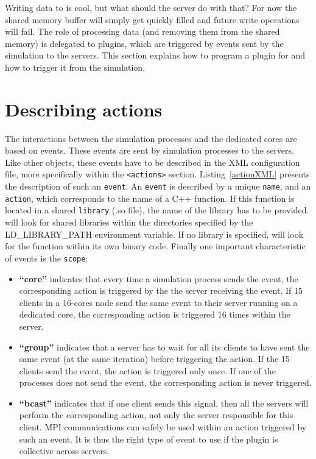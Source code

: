 Writing data to \Damaris{} is cool, but what should the server do with that? For now the shared memory
buffer will simply get quickly filled and future write operations will fail. The role of processing data
(and removing them from the shared memory) is delegated to plugins, which are triggered by events
sent by the simulation to the servers.
This section explains how to program a plugin for \Damaris{} and how to trigger it from the simulation.

\section{Describing actions}

The interactions between the simulation processes and the dedicated cores are based on events.
These events are sent by simulation processes to the servers.
Like other \Damaris{} objects, these events have to be described in the XML configuration file,
more specifically within the \texttt{<actions>} section.
Listing~\ref{actionXML} presents the description of such an \texttt{event}.
An \texttt{event} is described by a unique \texttt{name}, and an \texttt{action}, which corresponds to
the name of a C++ function. If this function is located in a shared \texttt{library} (.so file), the name
of the library has to be provided. \Damaris{} will look for shared libraries within the directories
specified by the LD\_LIBRARY\_PATH environment variable. If no library is specified, \Damaris{}
will look for the function within its own binary code.
Finally one important characteristic of events is the \texttt{scope}:
\begin{itemize}
	\item \textbf{``core''} indicates that every time a simulation process sends the event, the
	corresponding action is triggered by the the server receiving the event. If 15 clients 
	in a 16-cores node send the same event to their server running on a dedicated core, 
	the corresponding action is triggered 16 times within the server.
	\item \textbf{``group''} indicates that a server has to wait for all its clients to have sent
	the same event (at the same iteration) before triggering the action. If the 15 clients
	send the event, the action is triggered only once. If one of the processes does not send the
	event, the corresponding action is never triggered.
	\item \textbf{``bcast''} indicates that if one client sends this signal, then all the servers 
	will perform the corresponding action, not only the server responsible for this
	client. MPI communications can safely be used within an action triggered by such an event.
	It is thus the right type of event to use if the plugin is collective across servers.
\end{itemize}


